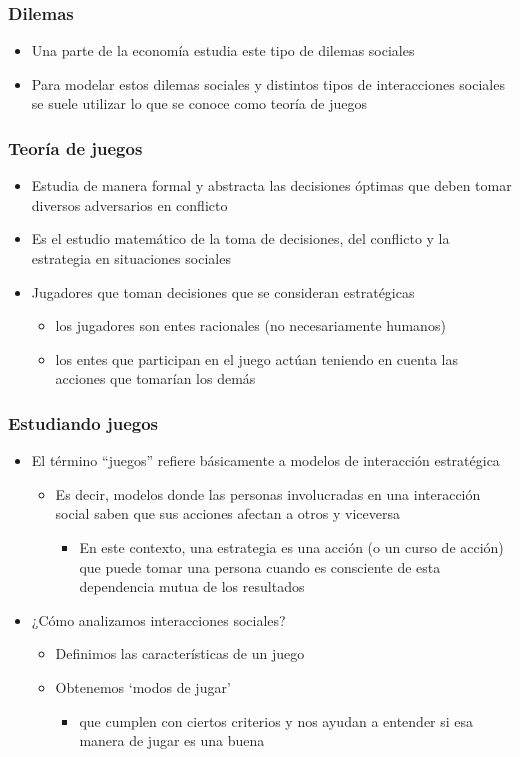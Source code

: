 \documentclass{beamer}
\begin{document}
\begin{frame}
\frametitle{ Dilemas}
\begin{itemize}
    \item Una parte de la economía estudia este tipo de dilemas sociales
    \item Para modelar estos dilemas sociales y distintos tipos de interacciones sociales se suele utilizar lo que se conoce como teoría de juegos
    \end{itemize}
\end{frame}

\begin{frame}
\frametitle{ Teoría de juegos}
\begin{itemize}
\item Estudia de manera formal y abstracta las decisiones óptimas que deben tomar diversos adversarios en conflicto
\item Es el estudio matemático de la toma de decisiones, del conflicto y la estrategia en situaciones sociales
\item Jugadores que toman decisiones que se consideran estratégicas
    \begin{itemize}
        \item los jugadores son entes racionales (no necesariamente humanos)
        \item los entes que participan en el juego actúan teniendo en cuenta las acciones que tomarían los demás
            \end{itemize}
\end{itemize}
\end{frame}


\begin{frame}
\frametitle{ Estudiando juegos}
\begin{itemize}
\item El término ``juegos'' refiere básicamente a modelos de interacción estratégica
\begin{itemize}
    \item Es decir, modelos donde las personas involucradas en una interacción social saben que sus acciones afectan a otros y viceversa
    \begin{itemize}
        \item En este contexto, una estrategia es una acción (o un curso de acción) que puede tomar una persona cuando es consciente de esta dependencia mutua de los resultados
    \end{itemize}
\end{itemize}
\item ¿Cómo analizamos interacciones sociales?
\begin{itemize}
    \item Definimos las características de un juego
    \item Obtenemos ‘modos de jugar’
    \begin{itemize}
        \item que cumplen con ciertos criterios y nos ayudan a entender si esa manera de jugar es una buena
    \end{itemize}
\end{itemize}
\end{itemize}
\end{frame}
\end{document}
